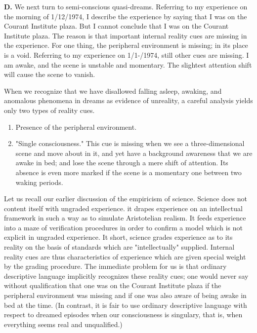 \documentclass[10pt,twoside,draft]{memoir}
\begin{document}
{{\textbf{D.} We next turn to semi-conscious quasi-dreams. Referring to my 
experience on the morning of 1/12/1974, I describe the experience by saying 
that I was on the Courant Institute plaza. But I cannot conclude that I was 
on the Courant Institute plaza. The reason is that important internal reality 
cues are missing in the experience. For one thing, the peripheral environment 
is missing; in its place is a void. Referring to my experience on 1/1-/1974, 
still other cues are missing. I am awake, and the scene is unstable and 
momentary. The slightest attention shift will cause the scene to vanish. 

When we recognize that we have disallowed falling asleep, awaking, and 
anomalous phenomena in dreams as evidence of unreality, a careful analysis 
yields only two types of reality cues. 

\begin{enumerate}
\item Presence of the peripheral environment. 

\item "Single consciousness." This cue is missing when we see a 
three-dimensional scene and move about in it, and yet have a background 
awareness that we are awake in bed; and lose the scene through a mere shift 
of attention. Its absence is even more marked if the scene is a momentary 
one between two waking periods. 
\end{enumerate}

Let us recall our earlier discussion of the empiricism of science. Science 
does not content itself with ungraded experience. it drapes experience on an 
intellectual framework in such a way as to simulate Aristotelian realism. It 
feeds experience into a maze of verification procedures in order to confirm a 
model which is not explicit in ungraded experience. It short, science grades 
experience as to its reality on the basis of standards which are 
"intellectually" supplied. Internal reality cues are thus characteristics of 
experience which are given special weight by the grading procedure. The 
immediate problem for us is that ordinary descriptive language implicitly 
recognizes these reality cues; one would never say without qualification that 
one was on the Courant Institute plaza if the peripheral environment was 
missing and if one was also aware of being awake in bed at the time. (In 
contrast, it is fair to use ordinary descriptive language with respect to 
dreamed episodes when our consciousness is singulary, that is, when 
everything seems real and unqualified.)

}}
\end{document}
